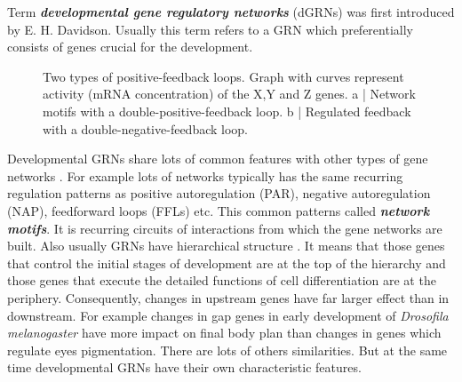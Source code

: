 \documentclass[a4paper, oneside]{report}
\begin{document}
Term \textbf{\textit{developmental gene regulatory networks}} (dGRNs) was first introduced by E. H. Davidson.
Usually this term refers to a GRN which preferentially consists of genes crucial for the development. 

\begin{figure}[h]
\caption{Two types of positive-feedback loops. Graph with curves represent activity (mRNA concentration) of the X,Y and Z genes. 
a | Network motifs with a double-positive-feedback loop.
b | Regulated feedback with a double-negative-feedback loop.}
\end{figure}

Developmental GRNs share lots of common features with other types of gene networks \cite{Alon2007}.
For example lots of networks typically has the same recurring regulation patterns as positive autoregulation (PAR), negative autoregulation (NAP), feedforward loops (FFLs) etc.
This common patterns called \textbf{\textit{network motifs}}.
It is recurring circuits of interactions from which the gene networks are built.
Also usually GRNs have hierarchical structure \cite{Erwin2009}.
It means that those genes that control the initial stages of development are at the top of the hierarchy and those genes that execute the detailed functions of cell differentiation are at the periphery.
Consequently, changes in upstream genes have far larger effect than in downstream.
For example changes in gap genes in early development of \textit{Drosofila melanogaster} have more impact on final body plan than changes in genes which regulate eyes pigmentation.
There are lots of others similarities.
But at the same time developmental GRNs have their own characteristic features.
\end{document}
